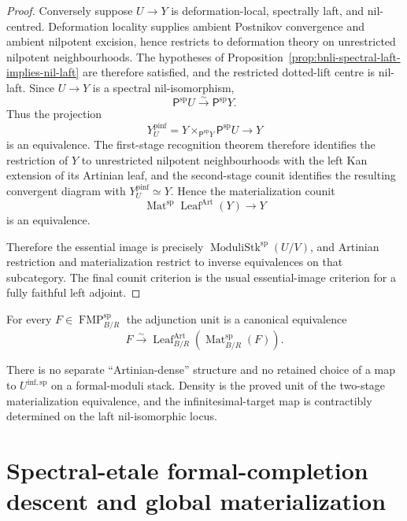 \begin{proof}
Conversely suppose $U\to Y$ is deformation-local, spectrally laft, and
nil-centred.  Deformation locality supplies ambient Postnikov convergence and
ambient nilpotent excision, hence restricts to deformation theory on
unrestricted nilpotent neighbourhoods.  The hypotheses of
Proposition~\ref{prop:bnli-spectral-laft-implies-nil-laft} are therefore
satisfied, and the restricted dotted-lift centre is nil-laft.  Since $U\to Y$ is a spectral
nil-isomorphism,
\[
    \mathsf P^{\mathrm{sp}}U
    \xrightarrow{\sim}
    \mathsf P^{\mathrm{sp}}Y.
\]
Thus the projection
\[
    Y_U^{\mathrm{pinf}}
    =
    Y\times_{\mathsf P^{\mathrm{sp}}Y}\mathsf P^{\mathrm{sp}}U
    \longrightarrow Y
\]
is an equivalence.  The first-stage recognition theorem therefore identifies
the restriction of $Y$ to unrestricted nilpotent neighbourhoods with the left
Kan extension of its Artinian leaf, and the second-stage counit identifies the
resulting convergent diagram with $Y_U^{\mathrm{pinf}}\simeq Y$.  Hence the
materialization counit
\[
    \operatorname{Mat}^{\mathrm{sp}}
    \operatorname{Leaf}^{\mathrm{Art}}(Y)
    \longrightarrow Y
\]
is an equivalence.

Therefore the essential image is precisely
$\operatorname{ModuliStk}^{\mathrm{sp}}(U/V)$, and Artinian restriction and
materialization restrict to inverse equivalences on that subcategory.  The
final counit criterion is the usual essential-image criterion for a fully
faithful left adjoint.
\end{proof}

\begin{corollary}
\label{thm:bnli-affine-density}
For every $F\in\operatorname{FMP}^{\mathrm{sp}}_{B/R}$ the adjunction unit is a
canonical equivalence
\[
\boxed{
    F
    \xrightarrow{\sim}
    \operatorname{Leaf}^{\mathrm{Art}}_{B/R}
    \left(
      \operatorname{Mat}^{\mathrm{sp}}_{B/R}(F)
    \right).}
\]
\end{corollary}

\begin{remark}
There is no separate ``Artinian-dense'' structure and no retained choice of a
map to $U^{\mathrm{inf,sp}}$ on a formal-moduli stack.  Density is the proved
unit of the two-stage materialization equivalence, and the infinitesimal-target
map is contractibly determined on the laft nil-isomorphic locus.
\end{remark}

\section{Spectral-etale formal-completion descent and global materialization}
\label{sec:bnli-materialization-descent}

